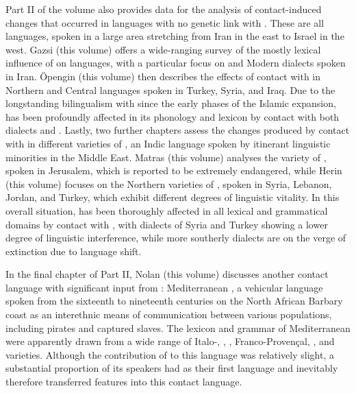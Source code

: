 \documentclass[output=paper]{langsci/langscibook}
\begin{document}
Part II of the volume also provides data for the analysis of contact-induced changes that occurred in languages with no genetic link with . These are all  languages, spoken in a large area stretching from Iran in the east to Israel in the west. Gazsi (this volume) offers a wide-ranging survey of the mostly lexical influence of  on  languages, with a particular focus on  and Modern  dialects spoken in Iran. Öpengin (this volume) then describes the effects of contact with  in Northern and Central  languages spoken in Turkey, Syria, and Iraq. Due to the longstanding {bilingualism} with  since the early phases of the Islamic expansion,  has been profoundly affected in its phonology and lexicon by contact with both  dialects and  . Lastly, two further chapters assess the changes produced by contact with  in different varieties of , an Indic language spoken by itinerant linguistic minorities in the Middle East. Matras (this volume) analyses the  variety of , spoken in Jerusalem, which is reported to be extremely {endangered}, while Herin (this volume) focuses on the Northern varieties of , spoken in Syria, Lebanon, Jordan, and Turkey, which exhibit different degrees of linguistic vitality. In this overall situation,  has been thoroughly affected in all lexical and grammatical domains by contact with , with dialects of Syria and Turkey showing a lower degree of linguistic interference, while more southerly dialects are on the verge of extinction due to {language shift}.


In the final chapter of Part II, Nolan (this volume) discusses another contact language with significant input from : Mediterranean , a vehicular language spoken from the sixteenth to nineteenth centuries on the North African Barbary coast as an interethnic means of communication between various populations, including pirates and captured slaves. The lexicon and grammar of Mediterranean  were apparently drawn from a wide range of Italo-, , , Franco-Provençal, ,  and  varieties. Although the contribution of  to this language was relatively slight, a substantial proportion of its speakers had  as their first language and inevitably therefore transferred  features into this contact language.
\end{document}
